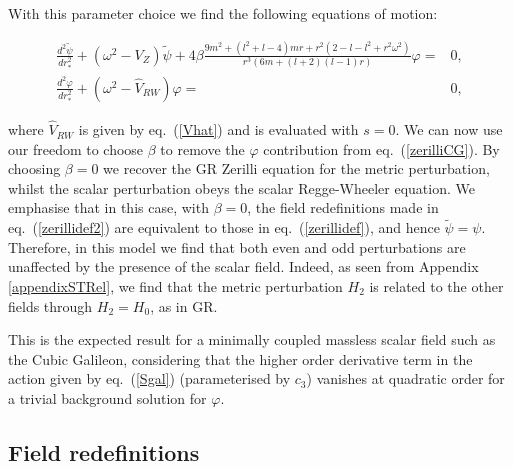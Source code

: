 \documentclass[10pt,twocolumn,preprintnumbers,amsmath,amssymb,nofootinbib
,superscriptaddress]{revtex4-1}
\begin{document}
{With this parameter choice we find the following equations of motion:
\begin{widetext}
\begin{align}
\frac{d^2\tilde{\psi}}{dr_\ast^2}+\left(\omega^2-V_Z\right)\tilde{\psi}+4\beta\frac{9m^2+\left(l^2+l-4\right)mr+r^2\left(2-l-l^2+r^2\omega^2\right)}{r^3\left(6m+(l+2)(l-1)r\right)}\varphi=&0, \label{zerilliCG}\\
\frac{d^2\varphi}{dr_\ast^2}+\left(\omega^2-\hat{V}_{RW}\right)\varphi=&0,
\end{align}
\end{widetext}
where $\hat{V}_{RW}$ is given by eq.~(\ref{Vhat}) and is evaluated with $s=0$. We can now use our freedom to choose $\beta$ to remove the $\varphi$ contribution from eq.~(\ref{zerilliCG}). By choosing $\beta=0$ we recover the GR Zerilli equation for the metric perturbation, whilst the scalar perturbation obeys the scalar Regge-Wheeler equation. We emphasise that in this case, with $\beta=0$, the field redefinitions made in eq.~(\ref{zerillidef2}) are equivalent to those in eq.~(\ref{zerillidef}), and hence $\tilde{\psi}=\psi$. Therefore, in this model we find that both even and odd perturbations are unaffected by the presence of the scalar field. Indeed, as seen from Appendix \ref{appendixSTRel}, we find that the metric perturbation $H_2$ is related to the other fields through $H_2=H_0$, as in GR.

This is the expected result for a minimally coupled massless scalar field such as the Cubic Galileon, considering that the higher order derivative term in the action given by eq.~(\ref{Sgal}) (parameterised by $c_3$) vanishes at quadratic order for a trivial background solution for $\varphi$.

\subsection{Field redefinitions}\label{fieldsST}

}
\end{document}
